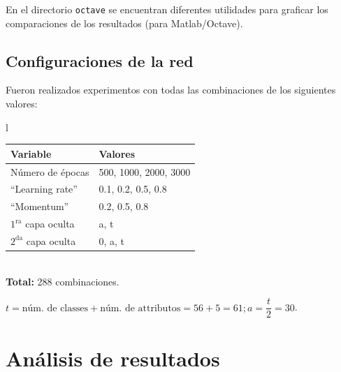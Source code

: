 \documentclass{article}
\begin{document}
\medskip
En el directorio \verb|octave| se encuentran diferentes utilidades para graficar los comparaciones de los resultados (para Matlab/Octave).

\subsection{Configuraciones de la red}

Fueron realizados experimentos con todas las combinaciones de los siguientes valores:

\begin{center}
\begin{tabular}{l}
\begin{tabular}{|l|l|}
\hline
Variable 					& Valores				\\
\hline
Número de épocas			& 500, 1000, 2000, 3000 \\
``Learning rate''  	    	& 0.1, 0.2, 0.5, 0.8 	\\
``Momentum''				& 0.2, 0.5, 0.8 		\\
$1^{\text{ra}}$ capa oculta	& a, t					\\
$2^{\text{da}}$ capa oculta	& 0, a, t				\\
\hline
\end{tabular}\\
\textbf{Total:} 288 combinaciones.
\end{tabular}
\end{center}

\def\valT{61}
\def\valA{30}

$t=\text{núm. de classes} + \text{núm. de attributos} = 56+5=\valT; a=\dfrac{t}{2}=\valA$.



\section{Análisis de resultados}
\end{document}
